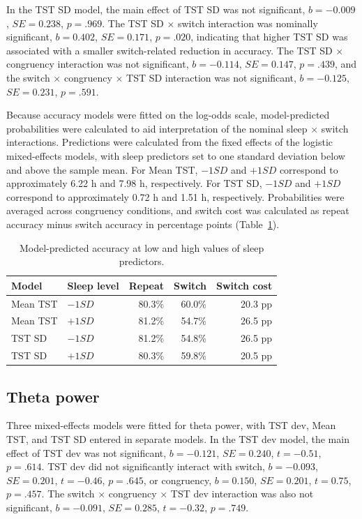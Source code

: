\documentclass[12pt,a4paper]{report}
\begin{document}
In the TST SD model, the main effect of TST SD was not significant, \(b = -0.009\), \(SE = 0.238\), \(p = .969\). The TST SD \(\times\) switch interaction was nominally significant, \(b = 0.402\), \(SE = 0.171\), \(p = .020\), indicating that higher TST SD was associated with a smaller switch-related reduction in accuracy. The TST SD \(\times\) congruency interaction was not significant, \(b = -0.114\), \(SE = 0.147\), \(p = .439\), and the switch \(\times\) congruency \(\times\) TST SD interaction was not significant, \(b = -0.125\), \(SE = 0.231\), \(p = .591\).

Because accuracy models were fitted on the log-odds scale, model-predicted probabilities were calculated to aid interpretation of the nominal sleep \(\times\) switch interactions. Predictions were calculated from the fixed effects of the logistic mixed-effects models, with sleep predictors set to one standard deviation below and above the sample mean. For Mean TST, \(-1 SD\) and \(+1 SD\) correspond to approximately 6.22 h and 7.98 h, respectively. For TST SD, \(-1 SD\) and \(+1 SD\) correspond to approximately 0.72 h and 1.51 h, respectively. Probabilities were averaged across congruency conditions, and switch cost was calculated as repeat accuracy minus switch accuracy in percentage points (Table~\ref{tab:accuracy_predicted_probabilities}).

\begin{table}[H]
\centering
\caption{Model-predicted accuracy at low and high values of sleep predictors.}
\label{tab:accuracy_predicted_probabilities}
\begin{tabular}{llrrr}
\toprule
Model & Sleep level & Repeat & Switch & Switch cost \\
\midrule
Mean TST & $-1 SD$ & 80.3\% & 60.0\% & 20.3 pp \\
Mean TST & $+1 SD$ & 81.2\% & 54.7\% & 26.5 pp \\
TST SD & $-1 SD$ & 81.2\% & 54.8\% & 26.5 pp \\
TST SD & $+1 SD$ & 80.3\% & 59.8\% & 20.5 pp \\
\bottomrule
\end{tabular}
\end{table}


\subsection{Theta power}

Three mixed-effects models were fitted for theta power, with TST dev, Mean TST, and TST SD entered in separate models. In the TST dev model, the main effect of TST dev was not significant, \(b = -0.121\), \(SE = 0.240\), \(t = -0.51\), \(p = .614\). TST dev did not significantly interact with switch, \(b = -0.093\), \(SE = 0.201\), \(t = -0.46\), \(p = .645\), or congruency, \(b = 0.150\), \(SE = 0.201\), \(t = 0.75\), \(p = .457\). The switch \(\times\) congruency \(\times\) TST dev interaction was also not significant, \(b = -0.091\), \(SE = 0.285\), \(t = -0.32\), \(p = .749\).
\end{document}
